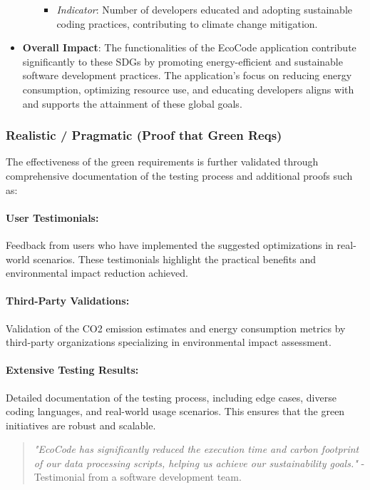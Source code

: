 \documentclass[conference,compsoc]{IEEEtran}
\begin{document}
\begin{itemize}
\begin{itemize}
\begin{itemize}
			            \item \textit{Indicator}: Number of developers educated and adopting sustainable coding practices, contributing to climate change mitigation.
		            \end{itemize}
	      \end{itemize}
	\item \textbf{Overall Impact}: The functionalities of the EcoCode application contribute significantly to these SDGs by promoting energy-efficient and sustainable software development practices. The application's focus on reducing energy consumption, optimizing resource use, and educating developers aligns with and supports the attainment of these global goals.
\end{itemize}

\subsubsection{Realistic / Pragmatic (Proof that Green Reqs)}
\label{sec:realistic_pragmatic}

The effectiveness of the green requirements is further validated through comprehensive documentation of the testing process and additional proofs such as:

\paragraph{User Testimonials:}
Feedback from users who have implemented the suggested optimizations in real-world scenarios. These testimonials highlight the practical benefits and environmental impact reduction achieved.

\paragraph{Third-Party Validations:}
Validation of the CO2 emission estimates and energy consumption metrics by third-party organizations specializing in environmental impact assessment.

\paragraph{Extensive Testing Results:}
Detailed documentation of the testing process, including edge cases, diverse coding languages, and real-world usage scenarios. This ensures that the green initiatives are robust and scalable.

\begin{quote}
	\textit{"EcoCode has significantly reduced the execution time and carbon footprint of our data processing scripts, helping us achieve our sustainability goals."} - Testimonial from a software development team.
\end{quote}
\end{document}
